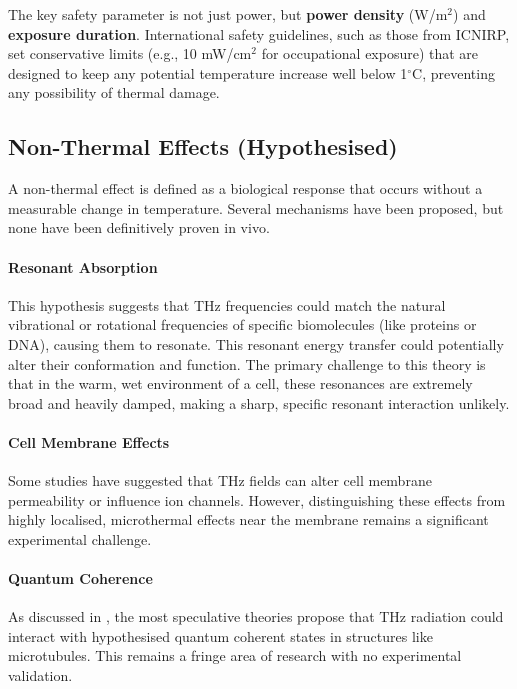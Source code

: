 \begin{warningbox}
    The key safety parameter is not just power, but \textbf{power density} (W/m$^2$) and \textbf{exposure duration}. International safety guidelines, such as those from ICNIRP, set conservative limits (e.g., 10 mW/cm$^2$ for occupational exposure) that are designed to keep any potential temperature increase well below 1$^\circ$C, preventing any possibility of thermal damage.
\end{warningbox}


\subsection{Non-Thermal Effects (Hypothesised)}

A non-thermal effect is defined as a biological response that occurs without a measurable change in temperature. Several mechanisms have been proposed, but none have been definitively proven in vivo.

\paragraph{Resonant Absorption}
This hypothesis suggests that THz frequencies could match the natural vibrational or rotational frequencies of specific biomolecules (like proteins or DNA), causing them to resonate. This resonant energy transfer could potentially alter their conformation and function. The primary challenge to this theory is that in the warm, wet environment of a cell, these resonances are extremely broad and heavily damped, making a sharp, specific resonant interaction unlikely.

\paragraph{Cell Membrane Effects}
Some studies have suggested that THz fields can alter cell membrane permeability or influence ion channels. However, distinguishing these effects from highly localised, microthermal effects near the membrane remains a significant experimental challenge.

\paragraph{Quantum Coherence}
As discussed in , the most speculative theories propose that THz radiation could interact with hypothesised quantum coherent states in structures like microtubules. This remains a fringe area of research with no experimental validation.


